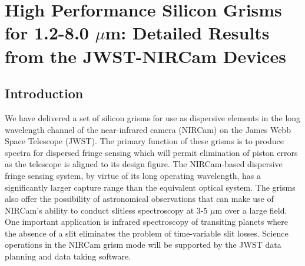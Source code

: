 \chapter{High Performance Silicon Grisms for 1.2-8.0 $\mu$m: Detailed Results from the JWST-NIRCam Devices} 
\label{chSPIE_2010}

\section{Introduction}
\label{sec:intro}  %


We have delivered a set of silicon grisms for use as dispersive elements in the long wavelength channel of the near-infrared camera (NIRCam)\cite{Horner04,Greene10} on the James Webb Space Telescope (JWST)\cite{Sabelhaus04}.  The primary function of these grisms is to produce spectra for dispersed fringe sensing which will permit elimination of piston errors as the telescope is aligned to its design figure\cite{Shi08}. The NIRCam-based dispersive fringe sensing system, by virtue of its long operating wavelength, has a significantly larger capture range than the equivalent optical system.  The grisms also offer the possibility of astronomical observations that can make use of NIRCam's ability to conduct slitless spectroscopy at 3-5 $\mu$m over a large field.  One important application is infrared spectroscopy of transiting planets where the absence of a slit eliminates the problem of time-variable slit losses\cite{Greene07}.  Science operations in the NIRCam grism mode will be supported by the JWST data planning and data taking software.

